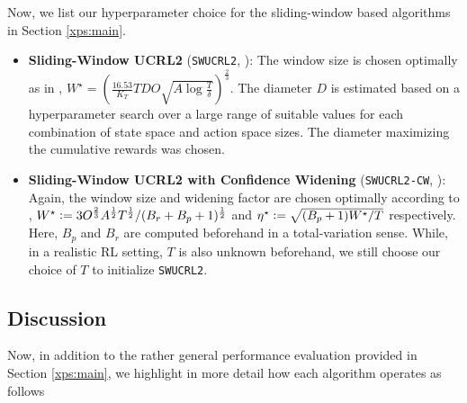 \documentclass{article} %
\newcommand{\dfq}{\vcentcolon=}
\begin{document}
Now, we list our hyperparameter choice for the sliding-window based algorithms in Section \ref{xps:main}. 
\begin{itemize}
    \item \textbf{Sliding-Window UCRL2} (\texttt{SWUCRL2},  \cite{SWUCRL}): The window size is chosen optimally as in \cite{SWUCRL}, $W^\star = \left(\frac{16.53}{K_T} T D O \sqrt{A \log{\frac{T}{\delta}}} \right)^\frac{2}{3}$. The diameter $D$ is estimated based on a hyperparameter search over a large range of suitable values for each combination of state space and action space sizes. The diameter maximizing the cumulative rewards was chosen. 
    \item \textbf{Sliding-Window UCRL2 with Confidence Widening} (\texttt{SWUCRL2-CW}, \cite{SWUCRL2CW}):  Again, the window size and widening factor are chosen optimally according to \cite{SWUCRL2CW}, $W^\star \dfq 3O^\frac{2}{3} A^\frac{1}{2} T^\frac{1}{2}/ (B_r + B_p + 1)^\frac{1}{2}$ and $\eta^\star \dfq \sqrt{(B_p + 1) W^\star / T}$ respectively. Here, $B_p$ and $B_r$ are computed beforehand in a total-variation sense. While, in a realistic RL setting, $T$ is also unknown beforehand, we still choose our choice of $T$ to initialize \texttt{SWUCRL2}. 
\end{itemize} 

\subsection{Discussion}\label{sec:xps_discussion}

Now, in addition to the rather general performance evaluation provided in Section \ref{xps:main}, we highlight in more detail how each algorithm operates as follows
\end{document}
